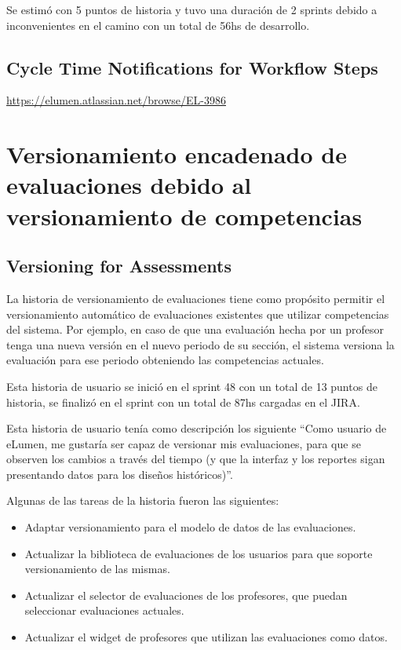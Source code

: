 Se estimó con 5 puntos de historia y tuvo una duración de 2 sprints debido a inconvenientes en el camino con un total de 56hs de desarrollo.

\subsection{Cycle Time Notifications for Workflow Steps}
\url{https://elumen.atlassian.net/browse/EL-3986}

\section{Versionamiento encadenado de evaluaciones debido al versionamiento de competencias}
\subsection{Versioning for Assessments}
La historia de versionamiento de evaluaciones tiene como propósito permitir el versionamiento automático de evaluaciones existentes que utilizar competencias del sistema. Por ejemplo, en caso de que una evaluación hecha por un profesor tenga una nueva versión en el nuevo periodo de su sección, el sistema versiona la evaluación para ese periodo obteniendo las competencias actuales.

Esta historia de usuario se inició en el sprint 48 con un total de 13 puntos de historia, se finalizó en el sprint con un total de 87hs cargadas en el JIRA.

Esta historia de usuario tenía como descripción los siguiente “Como usuario de eLumen, me gustaría ser capaz de versionar mis evaluaciones, para que se observen los cambios a través del tiempo (y que la interfaz y los reportes sigan presentando datos para los diseños históricos)”.

Algunas de las tareas de la historia fueron las siguientes:
\begin{itemize}
	\item Adaptar versionamiento para el modelo de datos de las evaluaciones.
	\item Actualizar la biblioteca de evaluaciones de los usuarios para que soporte versionamiento de las mismas.
	\item Actualizar el selector de evaluaciones de los profesores, que puedan seleccionar evaluaciones actuales.
	\item Actualizar el widget de profesores que utilizan las evaluaciones como datos.
\end{itemize}

